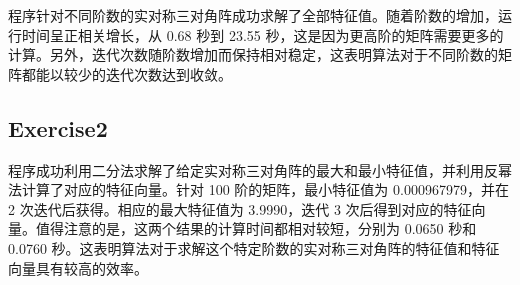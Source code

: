 \documentclass{article}
\begin{document}
程序针对不同阶数的实对称三对角阵成功求解了全部特征值。随着阶数的增加，运行时间呈正相关增长，从 0.68 秒到 23.55 秒，这是因为更高阶的矩阵需要更多的计算。另外，迭代次数随阶数增加而保持相对稳定，这表明算法对于不同阶数的矩阵都能以较少的迭代次数达到收敛。

\subsection*{Exercise2}
程序成功利用二分法求解了给定实对称三对角阵的最大和最小特征值，并利用反幂法计算了对应的特征向量。针对 100 阶的矩阵，最小特征值为 0.000967979，并在 2 次迭代后获得。相应的最大特征值为 3.9990，迭代 3 次后得到对应的特征向量。值得注意的是，这两个结果的计算时间都相对较短，分别为 0.0650 秒和 0.0760 秒。这表明算法对于求解这个特定阶数的实对称三对角阵的特征值和特征向量具有较高的效率。
\end{document}
